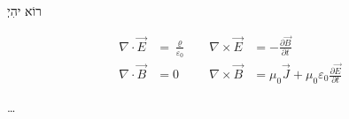 \documentclass[preview,border=1cm]{standalone}
\begin{document}


\andgodsaid{}

\begin{center}
{\ezr\huge רוֹא יהִיְ}
\end{center}

\whichmeans

\begin{align*}
\nabla \cdot \vec{E} &= \frac{\varrho}{\varepsilon_0}
\quad & \nabla \times \vec{E} &= - \frac{\partial \vec{B}}{\partial t} \\
\nabla \cdot \vec{B} &= 0
\quad & \nabla \times \vec{B} &= \mu_{0}\vec{J}
+ \mu_{0}\varepsilon_{0}\frac{\partial \vec{E}}{\partial t}
\end{align*}

\begin{flushright}
\dots{} \andtherewaslight
\end{flushright}
\end{document}
